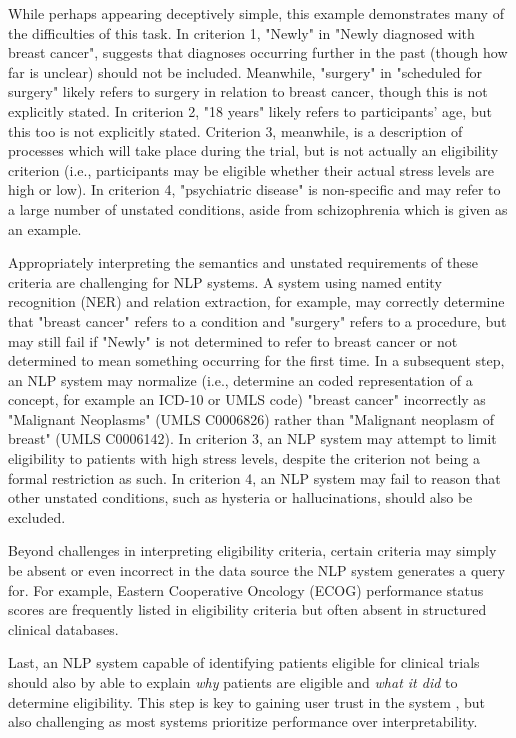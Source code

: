 \documentclass[../main.tex]{subfiles}
\begin{document}
\noindent While perhaps appearing deceptively simple, this example demonstrates many of the difficulties of this task. In criterion 1,  "Newly" in "Newly diagnosed with breast cancer", suggests that diagnoses occurring further in the past (though how far is unclear) should not be included. Meanwhile, "surgery" in "scheduled for surgery" likely refers to surgery in relation to breast cancer, though this is not explicitly stated. In criterion 2, "18 years" likely refers to participants' age, but this too is not explicitly stated. Criterion 3, meanwhile, is a description of processes which will take place during the trial, but is not actually an eligibility criterion (i.e., participants may be eligible whether their actual stress levels are high or low). In criterion 4, "psychiatric disease" is non-specific and may refer to a large number of unstated conditions, aside from schizophrenia which is given as an example.

Appropriately interpreting the semantics and unstated requirements of these criteria are challenging for NLP systems. A system using named entity recognition (NER) and relation extraction, for example, may correctly determine that "breast cancer" refers to a condition and "surgery" refers to a procedure, but may still fail if "Newly" is not determined to refer to breast cancer or not determined to mean something occurring for the first time. In a subsequent step, an NLP system may normalize (i.e., determine an coded representation of a concept, for example an ICD-10 or UMLS code) "breast cancer" incorrectly as "Malignant Neoplasms" (UMLS C0006826) rather than "Malignant neoplasm of breast" (UMLS C0006142). In criterion 3, an NLP system may attempt to limit eligibility to patients with high stress levels, despite the criterion not being a formal restriction as such. In criterion 4, an NLP system may fail to reason that other unstated conditions, such as hysteria or hallucinations, should also be excluded.

Beyond challenges in interpreting eligibility criteria, certain criteria may simply be absent or even incorrect in the data source the NLP system generates a query for. For example, Eastern Cooperative Oncology (ECOG) performance status scores \cite{sok2019objective} are frequently listed in eligibility criteria but often absent in structured clinical databases.

Last, an NLP system capable of identifying patients eligible for clinical trials should also by able to explain \textit{why} patients are eligible and \textit{what it did} to determine eligibility. This step is key to gaining user trust in the system \cite{lundberg2018explainable, jermutus2022influences}, but also challenging as most systems prioritize performance over interpretability.
\end{document}
